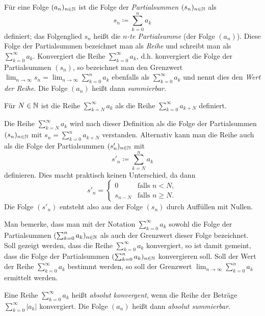 \documentclass[a4paper,10pt]{article}
\begin{document}
\begin{defi}
 Für eine Folge $(a_n)_{n \in \mathbb{N}}$ ist die Folge der \emph{Partialsummen} $(s_n)_{n \in \mathbb{N}}$ als
 \[
  s_n \coloneqq \sum_{k=0}^n a_k
 \]
 definiert; das Folgenglied $s_n$ heißt die \emph{$n$-te Partialsumme} (der Folge $(a_n)$). Diese Folge der Partialsummen bezeichnet man als \emph{Reihe} und schreibt man als $\sum_{k=0}^\infty a_k$. Konvergiert die Reihe $\sum_{k=0}^\infty a_k$, d.h. konvergiert die Folge der Partialsummen $(s_n)$, so bezeichnet man den Grenzwert $\lim_{n \to \infty} s_n = \lim_{n \to \infty} \sum_{k=0}^n a_k$ ebenfalls als $\sum_{k=0}^\infty a_k$ und nennt dies den \emph{Wert der Reihe}. Die Folge $(a_n)$ heißt dann \emph{summierbar}.
 
 Für $N \in \mathbb{N}$ ist die Reihe $\sum_{k=N}^\infty a_k$ als die Reihe $\sum_{k=0}^\infty a_{k+N}$ definiert.  
\end{defi}


\begin{bem}
 Die Reihe $\sum_{k=N}^\infty a_k$ wird nach dieser Definition als die Folge der Partialsummen $(s_n)_{n \in \mathbb{N}}$ mit $s_n = \sum_{k=0}^n a_{k+N}$ verstanden. Alternativ kann man die Reihe auch als die Folge der Partialsummen $(s'_n)_{n \in \mathbb{N}}$ mit
 \[
  s'_n \coloneqq \sum_{k=N}^n a_k
 \]
 definieren. Dies macht praktisch keinen Unterschied, da dann
 \[
  s'_n =
  \begin{cases}
   0       & \text{falls } n < N, \\
   s_{n-N} & \text{falls } n \geq N.
  \end{cases}
 \]
 Die Folge $(s'_n)$ entsteht also aus der Folge $(s_n)$ durch Auffüllen mit Nullen.
\end{bem}


Man bemerke, dass man mit der Notation $\sum_{k=0}^\infty a_k$ sowohl die Folge der Partialsummen $(\sum_{k=0}^n a_k)_{n \in \mathbb{N}}$ als auch der Grenzwert dieser Folge bezeichnet. Soll gezeigt werden, dass die Reihe $\sum_{k=0}^\infty a_k$ konvergiert, so ist damit gemeint, dass die Folge der Partialsummen $(\sum_{k=0}^n a_k)_{n \in \mathbb{N}}$ konvergieren soll. Soll der Wert der Reihe $\sum_{k=0}^\infty a_k$ bestimmt werden, so soll der Grenzwert $\lim_{n \to \infty} \sum_{k=0}^n a_k$ ermittelt werden.


\begin{defi}
 Eine Reihe $\sum_{k=0}^\infty a_k$ heißt \emph{absolut konvergent}, wenn die Reihe der Beträge $\sum_{k=0}^\infty |a_k|$ konvergiert. Die Folge $(a_n)$ heißt dann \emph{absolut summierbar}.
\end{defi}
\end{document}
